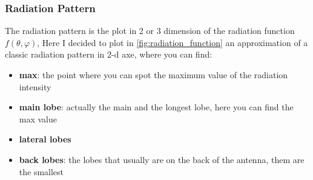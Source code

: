 \subsubsection*{Radiation Pattern}
The radiation pattern is the plot in 2 or 3 dimension of the radiation function $f(\theta,\varphi)$, Here I decided to plot in \cref{fig:radiation_function} an approximation of a classic radiation pattern in 2-d axe, where you can find:
\begin{itemize}
    \item \textbf{max}: the point where you can spot the maximum value of the radiation intensity
    \item \textbf{main lobe}: actually the main and the longest lobe, here you can find the max value
    \item \textbf{lateral lobes}
    \item \textbf{back lobes}: the lobes that usually are on the back of the antenna, them are the smallest
\end{itemize}
